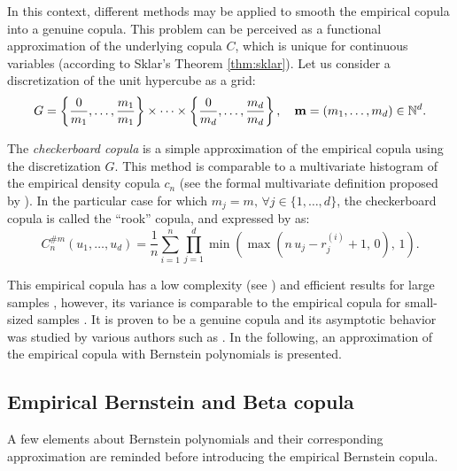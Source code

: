 In this context, different methods may be applied to smooth the empirical copula into a genuine copula. 
This problem can be perceived as a functional approximation of the underlying copula $C$, which is unique for continuous variables (according to Sklar's Theorem \ref{thm:sklar}). 
Let us consider a discretization of the unit hypercube as a grid: 
\begin{equation}
    G=\left\{\frac{0}{m_1}, \dots, \frac{m_1}{m_1}\right\} \times \dots \times \left\{\frac{0}{m_d}, \dots, \frac{m_d}{m_d}\right\}, \quad {\bf m} = (m_1, \dots, m_d) \in \mathbb{N}^d. 
\end{equation}

The \textit{checkerboard copula} is a simple approximation of the empirical copula using the discretization $G$. 
This method is comparable to a multivariate histogram of the empirical density copula $c_n$ (see the formal multivariate definition proposed by \citealp{cottin_2014_bernstein}).
In the particular case for which $m_j=m, \, \forall j \in \{1, \dots, d\}$, the checkerboard copula is called the ``rook'' copula, and expressed by \citet{segers_2017} as: 
\begin{equation}
    C_n^{\#m}(u_1, \dots, u_d) = \frac1n \sum_{i=1}^{n} \prod_{j=1}^{d} \min\left(\max(n\, u_j - r_j^{(i)} +1, \, 0), \, 1\right).
\end{equation}

This empirical copula has a low complexity (see \citealp{rose_2015}) and efficient results for large samples \citep{gonzalez_2021_checkerboard_copula}, however, its variance is comparable to the empirical copula for small-sized samples \citep{segers_2017}. 
It is proven to be a genuine copula and its asymptotic behavior was studied by various authors such as \citet{li_1998_checkerboard,genest_2017_asymptotic_checkerboard}. 
In the following, an approximation of the empirical copula with Bernstein polynomials is presented. 



\subsection{Empirical Bernstein and Beta copula}

A few elements about Bernstein polynomials and their corresponding approximation are reminded before introducing the empirical Bernstein copula.

